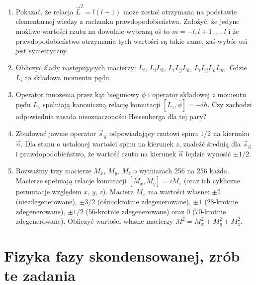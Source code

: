 \documentclass[a4paper,11pt]{article}
\begin{document}
\begin{enumerate}
\item Pokazać, że relacja $\vec{ L }^{ 2 } = l ( l + 1 )$ może zostać
  otrzymana na podstawie elementarnej wiedzy z rachunku
  prawdopodobieństwa. Założyć, że jedyne możliwe wartości rzutu na
  dowolnie wybraną oś to $m = -l, l + 1, \ldots, l$ i że prawdopodobieństwo
  otrzymania tych wartości są takie same, zaś wybór osi jest
  symetryczny.

\item Obliczyć ślady następujących macierzy: $L_{ i }$,
  $L_{ i } L_{ k }$, $L_{ i } L_{ j } L_{ k }$,
  $L_{ i } L_{ j } L_{ k } L_{ m }$. Gdzie $L_{ i }$ to składowa
  momentu pędu.

\item Operator mnożenia przez kąt biegunowy $\phi$ i operator składowej
  $z$ momentu pędu $L_{ z }$ spełniają kanoniczną relację komutacji
  $[ L_{ z }, \widehat{ \phi } ] = -i\hbar$. Czy zachodzi odpowiednia
  zasada nieoznaczoności Heisenberga dla tej pary?

\item Zbudować jawnie operator $\vec{ s }_{ \vec{ n } }$ odpowiadający
  rzutowi spinu $1 / 2$ na kierunku $\vec{ n }$. Dla stanu o ustalonej
  wartości spinu na kierunek $z$, znaleźć średnią dla
  $\vec{ s }_{ \vec{ n } }$ i prawdopodobieństwo, że wartość rzutu na
  kierunek $\vec{ n }$ będzie wynosić $\pm 1 / 2$.

\item Rozważmy trzy macierze $M_{ x }$, $M_{ y }$, $M_{ z }$ o
  wymiarach 256 na 256 każda. Macierze spełniają relacje komutacji
  $[ M_{ x }, M_{ y } ] = i M_{ z }$ (oraz ich cykliczne permutacje
  względem $x$, $y$, $z$). Macierz $M_{ x }$ ma wartości własne:
  $\pm 2$ (niezdegenerowane), $\pm 3 / 2$ (ośmiokrotnie zdegenerowane),
  $\pm 1$ (28-krotnie zdegenerowane), $\pm 1 / 2$ (56-krotnie
  zdegenerowane) oraz 0 (70-krotnie zdegenerowane). Obliczyć wartości
  własne macierzy
  $M^{ 2 } = M_{ x }^{ 2 } + M_{ y }^{ 2 } + M_{ z }^{ 2 }$.

\end{enumerate}










\section{Fizyka fazy skondensowanej, zrób te zadania}
\end{document}
